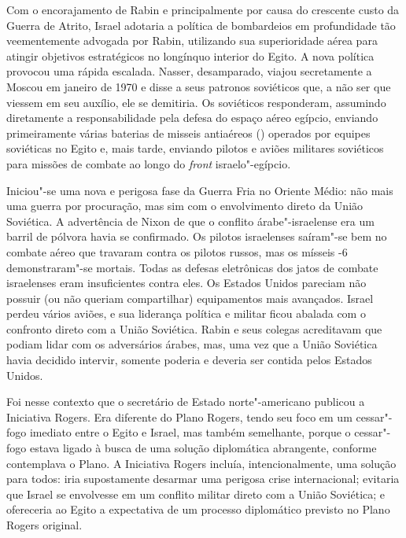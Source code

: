 Com o encorajamento de Rabin e principalmente por causa do crescente
custo da Guerra de Atrito, Israel adotaria a política de bombardeios em
profundidade tão veementemente advogada por Rabin, utilizando sua
superioridade aérea para atingir objetivos estratégicos no longínquo
interior do Egito. A nova política provocou uma rápida escalada. Nasser,
desamparado, viajou secretamente a Moscou em janeiro de 1970 e disse a
seus patronos soviéticos que, a não ser que viessem em seu auxílio, ele
se demitiria. Os soviéticos responderam, assumindo diretamente a
responsabilidade pela defesa do espaço aéreo egípcio, enviando
primeiramente várias baterias de misseis antiaéreos () operados por
equipes soviéticas no Egito e, mais tarde, enviando pilotos e aviões
militares soviéticos para missões de combate ao longo do \emph{front}
israelo"-egípcio.

Iniciou"-se uma nova e perigosa fase da Guerra Fria no Oriente Médio: não
mais uma guerra por procuração, mas sim com o envolvimento direto da
União Soviética. A advertência de Nixon de que o conflito
árabe"-israelense era um barril de pólvora havia se confirmado. Os
pilotos israelenses saíram"-se bem no combate aéreo que travaram contra
os pilotos russos, mas os mísseis -6 demonstraram"-se mortais. Todas
as defesas eletrônicas dos jatos de combate israelenses eram
insuficientes contra eles. Os Estados Unidos pareciam não possuir (ou
não queriam compartilhar) equipamentos mais avançados. Israel perdeu
vários aviões, e sua liderança política e militar ficou abalada com o
confronto direto com a União Soviética. Rabin e seus colegas acreditavam
que podiam lidar com os adversários árabes, mas, uma vez que a União
Soviética havia decidido intervir, somente poderia e deveria ser contida
pelos Estados Unidos.

Foi nesse contexto que o secretário de Estado norte"-americano publicou a
Iniciativa Rogers. Era diferente do Plano Rogers, tendo seu foco em um
cessar"-fogo imediato entre o Egito e Israel, mas também semelhante, porque o
cessar"-fogo estava ligado à busca de uma solução diplomática abrangente,
conforme contemplava o Plano. A Iniciativa Rogers incluía,
intencionalmente, uma solução para todos: iria supostamente desarmar uma
perigosa crise internacional; evitaria que Israel se envolvesse em um
conflito militar direto com a União Soviética; e ofereceria ao Egito a
expectativa de um processo diplomático previsto no Plano Rogers
original.

